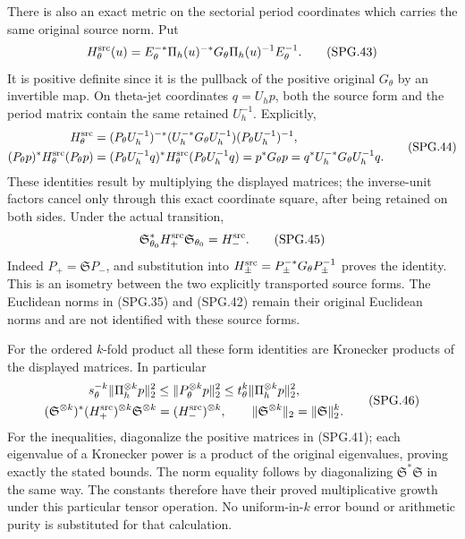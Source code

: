 There is also an exact metric on the sectorial period coordinates
which carries the same original source norm. Put
\[
 H_\theta^{\rm src}(u)
       =E_\theta^{-*}\Pi_h(u)^{-*}G_\theta
                                   \Pi_h(u)^{-1}E_\theta^{-1}.
 \tag{SPG.43}\label{eq:spg-source-period-metric}
\]
It is positive definite since it is the pullback of the positive
original \(G_\theta\) by an invertible map. On theta-jet
coordinates \(q=U_hp\), both the source form and the period
matrix contain the same retained \(U_h^{-1}\). Explicitly,
\[
 \begin{split}
 H_\theta^{\rm src}
   &=(P_\theta U_h^{-1})^{-*}
       (U_h^{-*}G_\theta U_h^{-1})
                           (P_\theta U_h^{-1})^{-1},\\
 (P_\theta p)^*H_\theta^{\rm src}(P_\theta p)
   &=(P_\theta U_h^{-1}q)^*H_\theta^{\rm src}
                         (P_\theta U_h^{-1}q)
     =p^*G_\theta p=q^*U_h^{-*}G_\theta U_h^{-1}q.
 \end{split}
 \tag{SPG.44}\label{eq:spg-source-isometry}
\]
These identities result by multiplying the displayed matrices; the
inverse-unit factors cancel only through this exact coordinate
square, after being retained on both sides. Under the actual
transition,
\[
 \mathfrak S_{\theta_0}^*H_+^{\rm src}
                         \mathfrak S_{\theta_0}=H_-^{\rm src}.
 \tag{SPG.45}\label{eq:spg-transition-source-metric}
\]
Indeed \(P_+=\mathfrak S P_-\), and substitution into
\(H_\pm^{\rm src}=P_\pm^{-*}G_\theta P_\pm^{-1}\) proves the
identity. This is an isometry between the two explicitly transported
source forms. The Euclidean norms in (SPG.35) and (SPG.42) remain
their original Euclidean norms and are not identified with these
source forms.

For the ordered \(k\)-fold product all these form identities are
Kronecker products of the displayed matrices. In particular
\[
 \begin{gathered}
 s_\theta^{-k}\|\Pi_h^{\otimes k}p\|_2^2
   \le\|P_\theta^{\otimes k}p\|_2^2
   \le t_\theta^k\|\Pi_h^{\otimes k}p\|_2^2,\\
 (\mathfrak S^{\otimes k})^*(H_+^{\rm src})^{\otimes k}
         \mathfrak S^{\otimes k}=(H_-^{\rm src})^{\otimes k},
 \qquad
 \|\mathfrak S^{\otimes k}\|_2=\|\mathfrak S\|_2^k.
 \end{gathered}
 \tag{SPG.46}\label{eq:spg-tensor-metric}
\]
For the inequalities, diagonalize the positive matrices in
(SPG.41); each eigenvalue of a Kronecker power is a product of
the original eigenvalues, proving exactly the stated bounds.
The norm equality follows by diagonalizing \(\mathfrak S^*
\mathfrak S\) in the same way. The constants therefore have
their proved multiplicative growth under this particular tensor
operation. No uniform-in-\(k\) error bound or arithmetic purity
is substituted for that calculation.
